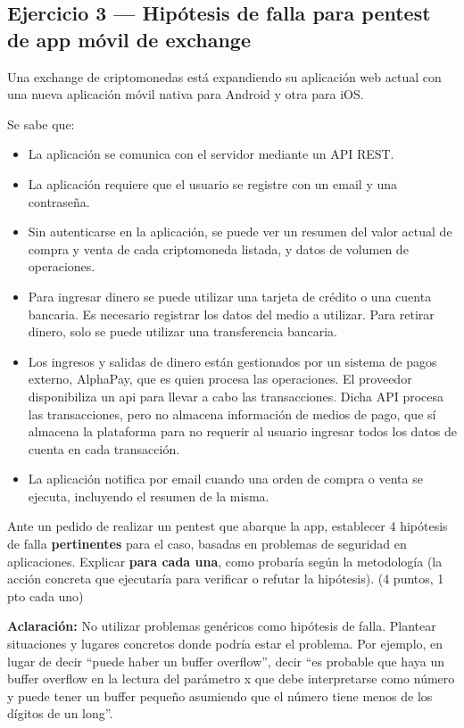 \subsection{Ejercicio 3 --- Hipótesis de falla para pentest de app móvil de exchange}

\begin{consigna}
Una exchange de criptomonedas está expandiendo su aplicación web actual con una nueva
aplicación móvil nativa para Android y otra para iOS.

Se sabe que:
\begin{itemize}
  \item La aplicación se comunica con el servidor mediante un API REST.
  \item La aplicación requiere que el usuario se registre con un email y una
  contraseña.
  \item Sin autenticarse en la aplicación, se puede ver un resumen del valor actual de
  compra y venta de cada criptomoneda listada, y datos de volumen de operaciones.
  \item Para ingresar dinero se puede utilizar una tarjeta de crédito o una cuenta
  bancaria. Es necesario registrar los datos del medio a utilizar. Para retirar dinero,
  solo se puede utilizar una transferencia bancaria.
  \item Los ingresos y salidas de dinero están gestionados por un sistema de pagos
  externo, AlphaPay, que es quien procesa las operaciones. El proveedor disponibiliza un
  api para llevar a cabo las transacciones. Dicha API procesa las transacciones, pero no
  almacena información de medios de pago, que sí almacena la plataforma para no
  requerir al usuario ingresar todos los datos de cuenta en cada transacción.
  \item La aplicación notifica por email cuando una orden de compra o venta se ejecuta,
  incluyendo el resumen de la misma.
\end{itemize}

Ante un pedido de realizar un pentest que abarque la app, establecer 4 hipótesis de
falla \textbf{pertinentes} para el caso, basadas en problemas de seguridad en
aplicaciones. Explicar \textbf{para cada una}, como probaría según la metodología (la
acción concreta que ejecutaría para verificar o refutar la hipótesis). (4 puntos, 1 pto
cada uno)

\textbf{Aclaración:} No utilizar problemas genéricos como hipótesis de falla. Plantear
situaciones y lugares concretos donde podría estar el problema. Por ejemplo, en lugar de
decir ``puede haber un buffer overflow'', decir ``es probable que haya un buffer
overflow en la lectura del parámetro x que debe interpretarse como número y puede tener
un buffer pequeño asumiendo que el número tiene menos de los dígitos de un long''.
\end{consigna}

